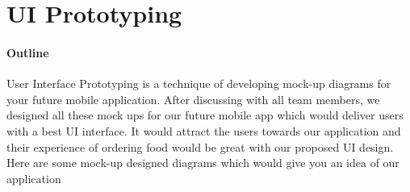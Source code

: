 \documentclass[12pt]{article}
\begin{document}
\section{UI Prototyping}

\paragraph{Outline}
User Interface Prototyping is a technique of developing mock-up diagrams for your future mobile application. After discussing with all team members, we designed all these mock ups for our future mobile app which would deliver users with a best UI interface. It would attract the users towards our application and their experience of ordering food would be great with our proposed UI design. Here are some mock-up designed diagrams which would give you an idea of our application
\end{document}
